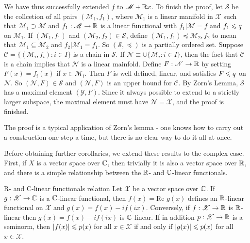 \begin{proofsolution}
    We have thus successfully extended $f$ to $\mathscr{M}+\mathbb{R} x$.
    To finish the proof, let $\mathscr{S}$ be the collcetion of all pairs $(\mathscr{M}_1,f_1)$, 
    where $\mathscr{M}_1$ is a linear manifold in $\mathscr{X}$ such that $\mathscr{M}_1\supset \mathscr{M}$ 
    and $f_1:\mathscr{M}\rightarrow \mathbb{R}$ is a linear functional with $f_1|\mathscr{M}=f$ and $f_1\leqslant q$ on $\mathscr{M}_1$.
    If $(\mathscr{M}_1,f_1)$ and $(\mathscr{M}_2,f_2)\in\mathscr{S}$, define $(\mathscr{M}_1,f_1)\preceq \mathscr{M}_2,f_2$ 
    to mean that $\mathscr{M}_1\subseteq \mathscr{M}_2$ and $f_2|\mathscr{M}_1=f_1$.
    So $(\mathscr{S},\preceq)$ is a partially ordered set.
    Suppose $\mathscr{C}=\{(\mathscr{M}_i,f_i):i\in I\}$ is a chain in $\mathscr{S}$.
    If $\mathscr{N}\equiv \cup \{\mathscr{M}_i:i\in I\}$, then the fact that $\mathscr{C}$ is a chain implies that $\mathscr{N}$
    is a linear mainfold. Define $F:\mathscr{N}\rightarrow\mathbb{R}$ by setting $F(x)=f_i(x)$ if $x\in \mathscr{M}_i$. 
    Then $F$ is well defined, linear, and satisfies $F\leqslant q$ on $\mathscr{N}$.
    So $(\mathscr{N}, F)\in \mathscr{S}$ and $(\mathscr{N},F)$ is an upper bound for $\mathscr{C}$.
    By Zorn's Lemma, $\mathscr{S}$ has a maximal element $(\mathscr{Y},F)$.
    Since it always possible to extend to a strictly larger subspace, the maximal element must have $\mathscr{N}=\mathscr{X}$,
    and the proof is finished. 
\end{proofsolution}

The proof is a typical application of Zorn's lemma - one knows how to carry out a
construction one step a time, but there is no clear way to do it all at once.


Before obtaining further corollaries, we extend these results to the complex case.
First, if $X$ is a vector space over $\mathbb{C}$, 
then trivially it is also a vector space over $\mathbb{R}$, and
there is a simple relationship between the
$\mathbb{R}$- and $\mathbb{C}$-linear functionals.

\begin{lemma}{}{R- and C-linear functionals relation}
    Let $\mathscr{X}$ be a vector space over $\mathbb{C}$.
    If $g:\mathscr{X}\rightarrow \mathbb{C}$ is a $\mathbb{C}$-linear functional, 
    then $f(x)=\text{Re }g(x)$ defines an $\mathbb{R}$-linear functional on $\mathscr{X}$
    and $g(x)=f(x)-if(ix)$.
    Conversely, if $f:\mathscr{X}\rightarrow \mathbb{R}$ is $\mathbb{R}$-linear then $g(x)=f(x)-if(ix)$ 
    is $\mathbb{C}$-linear.
    If in addition $p:\mathscr{X}\rightarrow \mathbb{R}$ is a seminorm, then $|f(x)|\leqslant p(x)$ for all $x\in\mathscr{X}$
    if and only if $|g(x)|\leqslant p(x)$ for all $x\in\mathscr{X}$.
\end{lemma}



